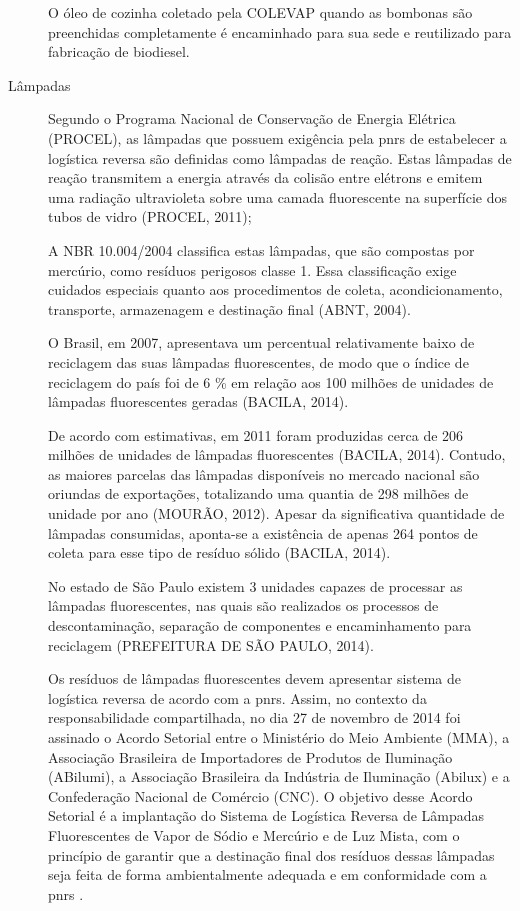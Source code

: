 \begin{description}
	O óleo de cozinha coletado pela COLEVAP quando as bombonas são preenchidas completamente é encaminhado para sua sede e reutilizado para fabricação de biodiesel.
	
	
	\item[Lâmpadas] Segundo o Programa Nacional de Conservação de Energia Elétrica (PROCEL), as lâmpadas que possuem exigência pela \gls{pnrs} de estabelecer a logística reversa são definidas como lâmpadas de reação. Estas lâmpadas de reação transmitem a energia através da colisão entre elétrons e emitem uma radiação ultravioleta sobre uma camada fluorescente na superfície dos tubos de vidro (PROCEL, 2011);
	
	A NBR 10.004/2004 classifica estas lâmpadas, que são compostas por mercúrio, como resíduos perigosos classe 1. Essa classificação exige cuidados especiais quanto aos procedimentos de coleta, acondicionamento, transporte, armazenagem e destinação final (ABNT, 2004).
	
	O Brasil, em 2007, apresentava um percentual relativamente baixo de reciclagem das suas lâmpadas fluorescentes, de modo que o índice de reciclagem do país foi de 6 \% em relação aos 100 milhões de unidades de lâmpadas fluorescentes geradas (BACILA, 2014).
	
	De acordo com estimativas, em 2011 foram produzidas cerca de 206 milhões de unidades de lâmpadas fluorescentes (BACILA, 2014). Contudo, as maiores parcelas das lâmpadas disponíveis no mercado nacional são oriundas de exportações, totalizando uma quantia de 298 milhões de unidade por ano (MOURÃO, 2012).
	Apesar da significativa quantidade de lâmpadas consumidas, aponta-se a existência de apenas 264 pontos de coleta para esse tipo de resíduo sólido (BACILA, 2014).
	
	No estado de São Paulo existem 3 unidades capazes de processar as lâmpadas fluorescentes, nas quais são realizados os processos de descontaminação, separação de componentes e encaminhamento para reciclagem (PREFEITURA DE SÃO PAULO, 2014).
	
	Os resíduos de lâmpadas fluorescentes devem apresentar sistema de logística reversa de acordo com a \gls{pnrs}. Assim, no contexto da responsabilidade compartilhada, no dia 27 de novembro de 2014 foi assinado o Acordo Setorial entre o Ministério do Meio Ambiente (MMA), a Associação Brasileira de Importadores de Produtos de Iluminação (ABilumi), a Associação Brasileira da Indústria de Iluminação (Abilux) e a Confederação Nacional de Comércio (CNC). O objetivo desse Acordo Setorial é a implantação do Sistema de Logística Reversa de Lâmpadas Fluorescentes de Vapor de Sódio e Mercúrio e de Luz Mista, com o princípio de garantir que a destinação final dos resíduos dessas lâmpadas seja feita de forma ambientalmente adequada e em conformidade com a \gls{pnrs} \cite{Acordo2014}.
	

\end{description}
